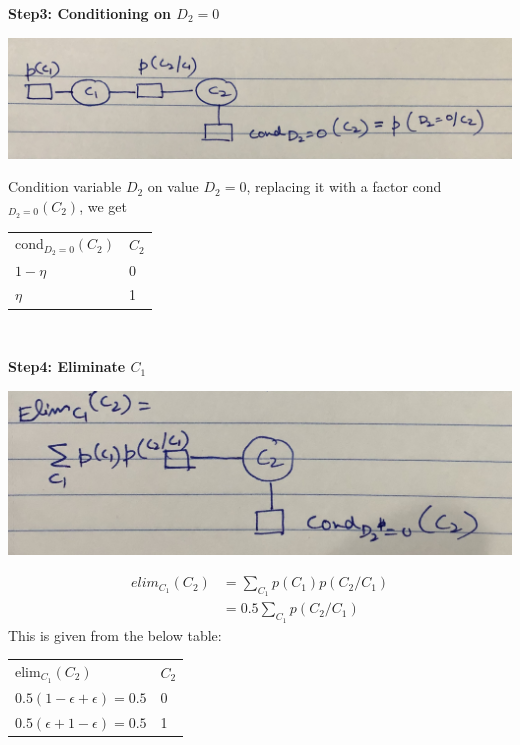 \documentclass[12pt]{article}
\begin{document}
\begin{enumerate}[label=(\alph*)]
\begin{center}
  \end{center}
  \textbf{Step3: Conditioning on $D_2 = 0$} \\
  \begin{center}
  \includegraphics[scale=0.1]{IMG_2278.jpg}
  \end{center}
  Condition variable $D_2$ on value $D_2 = 0$, replacing it with a factor cond$_{D_2 = 0}(C_2)$, we get
  \begin{center}
  \begin{tabular}{ll}
  cond$_{D_2 = 0}(C_2)$ & $C_2$  \\
  $1-\eta$            & 0       \\
  $\eta$               & 1       \\
  \end{tabular} \newline \\
  \end{center}
  \textbf{Step4: Eliminate $C_1$} \\
  \begin{center}
  \includegraphics[scale=0.1]{IMG_2277.jpg}
  \end{center}
  \begin{align*}
	elim_{C_1}(C_2) &= \sum_{C_1} p(C_1) p(C_2/C_1) \\
	&= 0.5 \sum_{C_1} p(C_2/C_1)
  \end{align*}
  This is given from the below table:
  \begin{center}
  \begin{tabular}{ll}
  elim$_{C_1}(C_2)$ & $C_2$  \\
  $0.5(1-\epsilon + \epsilon) = 0.5$            & 0       \\
  $0.5(\epsilon + 1-\epsilon) = 0.5$               & 1       \\

\end{tabular}
\end{center}
\end{enumerate}
\end{document}

